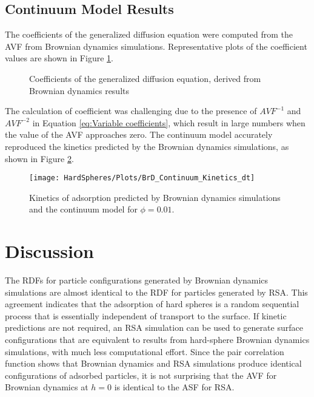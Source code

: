 \subsection{Continuum Model Results}

The coefficients of the generalized diffusion equation were computed
from the AVF from Brownian dynamics simulations. Representative plots
of the coefficient values are shown in Figure \ref{fig:Coefficient Plots}.%
\begin{figure}[H]

\caption{\label{fig:Coefficient Plots}Coefficients of the generalized diffusion
equation, derived from Brownian dynamics results}
%
\end{figure}
 The calculation of coefficient was challenging due to the presence
of $AVF^{-1}$ and $AVF^{-2}$ in Equation \ref{eq:Variable coefficients},
which result in large numbers when the value of the AVF approaches
zero. The continuum model accurately reproduced the kinetics predicted
by the Brownian dynamics simulations, as shown in Figure \ref{fig:Kinetics CFD BrD}.%
\begin{figure}
\texttt{[image: HardSpheres/Plots/BrD\_Continuum\_Kinetics\_dt]}

\caption{\label{fig:Kinetics CFD BrD}Kinetics of adsorption predicted by Brownian
dynamics simulations and the continuum model for $\phi=0.01$.}
%
\end{figure}



\section{Discussion}

The RDFs for particle configurations generated by Brownian dynamics
simulations are almost identical to the RDF for particles generated
by RSA. This agreement indicates that the adsorption of hard spheres
is a random sequential process that is essentially independent of
transport to the surface. If kinetic predictions are not required,
an RSA simulation can be used to generate surface configurations that
are equivalent to results from hard-sphere Brownian dynamics simulations,
with much less computational effort. Since the pair correlation function
shows that Brownian dynamics and RSA simulations produce identical
configurations of adsorbed particles, it is not surprising that the
AVF for Brownian dynamics at $h=0$ is identical to the ASF for RSA. 

